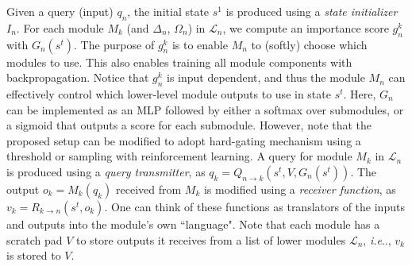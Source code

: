 \documentclass{article}
\makeatletter
\newcommand{\SK}[1]{{\color{NavyBlue}{[@Seung: #1]}}}
\DeclareRobustCommand\onedot{\futurelet\@let@token\@onedot}
\def\@onedot{\ifx\@let@token.\else.\null\fi\xspace}
\def\eg{\emph{e.g}\onedot} \def\Eg{\emph{E.g}\onedot}
\def\ie{\emph{i.e}\onedot} \def\Ie{\emph{I.e}\onedot}
\makeatother
\begin{document}
Given a query (input) $q_n$, the initial state $s^1$ is produced using a \emph{state initializer}$I_n$.
For each module $M_k$ (and $\Delta_n$, $\Omega_n$) in $\mathcal L_n$, we compute an importance score $g_n^k$ with $G_n(s^t)$. %
The purpose of $g_n^k$ is to enable $M_n$ to (softly) choose which modules to use.
This also enables training all module components with backpropagation.
Notice that $g_n^k$ is input dependent, and thus the module $M_n$ can effectively control which lower-level module outputs to use in state $s^t$. %
Here, $G_n$ can be implemented as an MLP followed by either a softmax over submodules, or a sigmoid that outputs a score for each submodule.
However, note that the proposed setup can be modified to adopt hard-gating mechanism using a threshold or sampling with reinforcement learning. %
A query for module $M_k$ in $\mathcal L_n$ is produced using a \emph{query transmitter}, as $q_k = Q_{n\rightarrow k}(s^t, V, G_n(s^t))$.
The output $o_k=M_k (q_k)$ received from $M_k$ is modified using a \emph{receiver function}, as $v_k = R_{k\rightarrow n}(s^t, o_k)$.
One can think of these functions as translators of the inputs and outputs into the module's own ``language".
Note that each module has a scratch pad $V$ to store outputs it receives from a list of lower modules $\mathcal L_n$, \ie, $v_k$ is stored to $V$.
\end{document}
